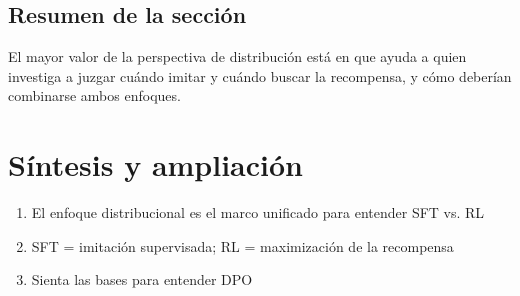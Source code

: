 \documentclass[a4paper]{article}
\begin{document}
\subsection{Resumen de la sección}
El mayor valor de la perspectiva de distribución está en que ayuda a quien investiga a juzgar cuándo imitar y cuándo buscar la recompensa, y cómo deberían combinarse ambos enfoques.

\newpage
\section{Síntesis y ampliación}
\begin{enumerate}
  \item El enfoque distribucional es el marco unificado para entender SFT vs. RL
  \item SFT = imitación supervisada; RL = maximización de la recompensa
  \item Sienta las bases para entender DPO
\end{enumerate}
\end{document}

